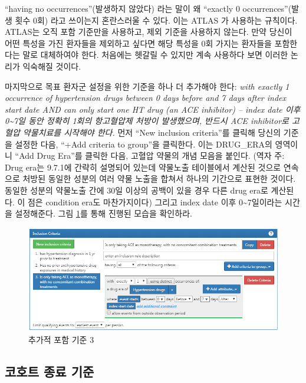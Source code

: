\documentclass[11pt]{book}
\theoremstyle{definition}
\theoremstyle{definition}
\theoremstyle{definition}
\theoremstyle{remark}
\begin{document}
``having no occurrences''(발생하지 않았다) 라는 말이 왜 ``exactly 0
occurrences''(발생 횟수 0회) 라고 쓰이는지 혼란스러울 수 있다. 이는
ATLAS 가 사용하는 규칙이다. ATLAS는 오직 포함 기준만을 사용하고, 제외
기준을 사용하지 않는다. 만약 당신이 어떤 특성을 가진 환자들을 제외하고
싶다면 해당 특성을 0회 가지는 환자들을 포함한다는 말로 대체하여야 한다.
처음에는 헷갈릴 수 있지만 계속 사용하다 보면 이러한 논리가 익숙해질
것이다.

마지막으로 목표 환자군 설정을 위한 기준을 하나 더 추가해야 한다:
\emph{with exactly 1 occurrence of hypertension drugs between 0 days
before and 7 days after index start date AND can only start one HT drug
(an ACE inhibitor) -- index date 이후 0\textasciitilde{}7일 동안 정확히
1회의 항고혈압제 처방이 발생했으며, 반드시 ACE inhibitor로 고혈압
약물치료를 시작해야 한다.} 먼저 ``New inclusion criteria''를 클릭해
당신의 기준을 설정한 다음, ``+Add criteria to group''을 클릭한다. 이는
DRUG\_ERA의 영역이니 ``Add Drug Era''를 클릭한 다음, 고혈압 약물의 개념
모음을 붙인다. (역자 주: Drug era는 9.7.1에 간략히 설명되어 있는데
약물노출 테이블에서 계산된 것으로 연속으로 처방된 동일한 성분의 여러
약물 노출을 합쳐서 하나의 기간으로 표현한 것이다. 동일한 성분의 약물노출
간에 30일 이상의 공백이 있을 경우 다른 drug era로 계산된다. 이 점은
condition era도 마찬가지이다) 그리고 index date 이후
0\textasciitilde{}7일이라는 시간을 설정해준다. 그림 \ref{fig:ATLASIC3}를
통해 진행된 모습을 확인하라.

\begin{figure}

{\centering \includegraphics[width=1\linewidth]{images/Cohorts/ATLAS-IC3} 

}

\caption{추가적 포함 기준 3}\label{fig:ATLASIC3}
\end{figure}

\subsection{코호트 종료 기준}\label{--}
\end{document}
